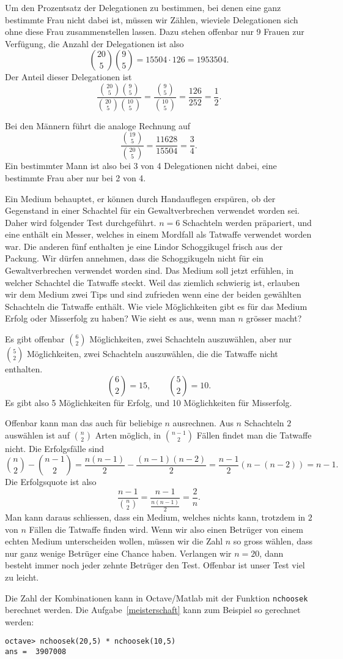 \begin{beispiele}
\begin{loesung}
Um den Prozentsatz der Delegationen zu bestimmen, bei denen
eine ganz bestimmte Frau nicht dabei ist, müssen wir Zählen,
wieviele Delegationen sich ohne diese Frau zusammenstellen 
lassen.
Dazu stehen offenbar nur 9 Frauen zur Verfügung, die 
Anzahl der Delegationen ist also
\[
\binom{20}{5}\binom{9}{5}=15504\cdot 126 = 1953504.
\]
Der Anteil dieser Delegationen ist
\[
\frac{
\binom{20}{5}\binom{9}{5}
}{
\binom{20}{5}\binom{10}{5}
}
=
\frac{ \binom{9}{5} }{ \binom{10}{5} }
=
\frac{126}{252}=\frac12.
\]
\end{loesung}
Bei den Männern führt die analoge Rechnung auf
\[
\frac{\binom{19}{5}}{\binom{20}{5}}=\frac{11628}{15504}=\frac34.
\]
Ein bestimmter Mann ist also bei 3 von 4 Delegationen nicht dabei,
eine bestimmte Frau aber nur bei 2 von 4.
\item Ein Medium behauptet, er können durch Handauflegen erspüren, ob
der Gegenstand in einer Schachtel für ein Gewaltverbrechen verwendet
worden sei.
Daher wird folgender Test durchgeführt.
$n=6$
Schachteln werden präpariert, und eine enthält ein Messer,
welches in einem Mordfall als Tatwaffe verwendet worden war.
Die anderen fünf enthalten je eine Lindor Schoggikugel frisch aus der Packung.
Wir dürfen annehmen, dass die Schoggikugeln nicht für ein Gewaltverbrechen
verwendet worden sind.
Das Medium soll jetzt erfühlen, in welcher
Schachtel die Tatwaffe steckt.
Weil das ziemlich schwierig ist, erlauben
wir dem Medium zwei Tips und sind zufrieden wenn eine der beiden
gewählten Schachteln die Tatwaffe enthält.
Wie viele Möglichkeiten gibt
es für das Medium Erfolg oder Misserfolg zu haben?
Wie sieht es aus, wenn man $n$ grösser macht?

\begin{loesung}
Es gibt offenbar $\binom{6}{2}$ Möglichkeiten, zwei Schachteln auszuwählen,
aber nur $\binom{5}{2}$ Möglichkeiten, zwei Schachteln auszuwählen,
die die Tatwaffe nicht enthalten.
\[
\binom{6}{2}=15,\qquad\binom{5}{2}=10.
\]
Es gibt also 5 Möglichkeiten für Erfolg, und 10 Möglichkeiten
für Misserfolg.

Offenbar kann man das auch für beliebige $n$ ausrechnen.
Aus $n$
Schachteln $2$ auswählen ist auf $\binom{n}2$ Arten möglich, in
$\binom{n-1}2$ Fällen findet man die Tatwaffe nicht.
Die Erfolgsfälle
sind
\[
\binom{n}2-\binom{n-1}2
=
\frac{n(n-1)}2-\frac{(n-1)(n-2)}2
=
\frac{n-1}2(n-(n-2))=n-1.
\]
Die Erfolgsquote ist also
\[
\frac{n-1}{\displaystyle\binom{n}2}
=
\frac{n-1}{\displaystyle\frac{n(n-1)}2}=\frac2n.
\]
Man kann daraus schliessen, dass ein Medium, welches nichts kann,
trotzdem in $2$ von $n$ Fällen die Tatwaffe finden wird.
Wenn wir also einen Betrüger von einem echten Medium unterscheiden
wollen, müssen wir die Zahl $n$ so gross wählen, dass nur ganz
wenige Betrüger eine Chance haben.
Verlangen wir $n=20$, dann
besteht immer noch jeder zehnte Betrüger den Test.
Offenbar ist unser
Test viel zu leicht.
\end{loesung}

\end{beispiele}
Die Zahl der Kombinationen kann in Octave/Matlab mit der Funktion
{\tt nchoosek} berechnet werden.
Die Aufgabe~\ref{meisterschaft}
kann zum Beispiel so gerechnet werden:
\begin{verbatim}
octave> nchoosek(20,5) * nchoosek(10,5)
ans =  3907008
\end{verbatim}

